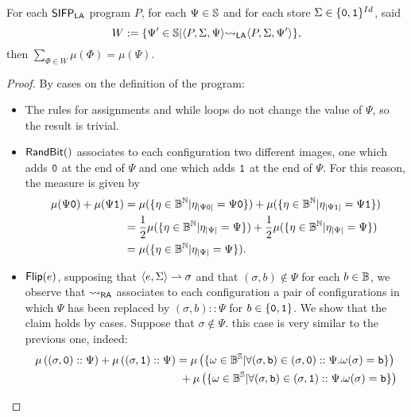 \begin{lemma}
  \label{lemma:sumsinvariance}
  For each $\mathsf{SIFP_{{\mathsf{LA}}}}$
  program $P$, for each $\Psi \in \mathbb{S}$ and for each
  store $\Sigma \in \{\mathtt{0}, \mathtt{1}\}^{Id}$, said
  $$
  W:=\{\Psi'\in \mathbb{S}| \langle P, \Sigma, \Psi\rangle {\leadsto_{\mathsf{LA}}} \langle P, \Sigma, \Psi'\rangle\},
  $$
  then $\sum_{\Phi \in W} \mu(\Phi)=\mu(\Psi)$.
\end{lemma}
\begin{proof}
  By cases on the definition of the program:
  \begin{itemize}
    \item The rules for assignments and while loops do not change the value of $\Psi$, so the result is trivial.
    \item $\mathsf{RandBit()}$ associates to each configuration two different images, one which adds $\mathtt{0}$ at the end of $\Psi$
    and one which adds $\mathtt{1}$ at the end of $\Psi$. For this reason, the measure is given by
    \begin{align*}
    \mu(\Psi\mathtt{0})+\mu (\Psi\mathtt{1}) &= \mu(\{\eta \in \mathbb{B}^{\mathbb{N}} | \eta_{|\Psi\mathtt{0}|}=\Psi\mathtt{0}\})+\mu(\{\eta \in \mathbb{B}^{\mathbb{N}} | \eta_{|\Psi\mathtt{1}|}=\Psi\mathtt{1}\})\\
                                  &=\frac 1 2 \mu(\{\eta \in \mathbb{B}^{\mathbb{N}} | \eta_{|\Psi|}=\Psi\})+\frac 1 2\mu(\{\eta \in \mathbb{B}^{\mathbb{N}} | \eta_{|\Psi|}=\Psi\})\\
                                  &= \mu(\{\eta \in \mathbb{B}^{\mathbb{N}} | \eta_{|\Psi|}=\Psi\}).
  \end{align*}
  \item $\mathsf{Flip(}e\mathsf{)}$, supposing that $\langle e, \Sigma\rangle \rightharpoonup \sigma$ and
  that $(\sigma, b)\not \in\Psi$ for each $b \in\mathbb{B}$, we observe that
  ${\leadsto_{\mathsf{RA}}}$
  associates to each configuration a pair of configurations
  in which $\Psi$ has been replaced by $(\sigma, b)::\Psi$ for $b \in \{\mathtt{0}, \mathtt{1}\}$.
  We show that the claim holds by cases. Suppose that $\sigma \not \in \Psi$.
  this case is very similar to the previous one, indeed:
  \begin{align*}
     \mu\left((\sigma, \zero)::\Psi\right)+\mu \left((\sigma, \one)::\Psi\right) &= \mu\left(\{\omega \in \Bool^\Ss | \forall (\sigma, \bool) \in (\sigma, \zero)::\Psi. \omega(\sigma)=\bool\}\right)\\
                                                           &\ +\mu\left(\{\omega \in \Bool^\Ss | \forall (\sigma, \bool) \in (\sigma, \one)::\Psi. \omega(\sigma)=\bool\}\right)\\

\end{align*}
\end{itemize}
\end{proof}
